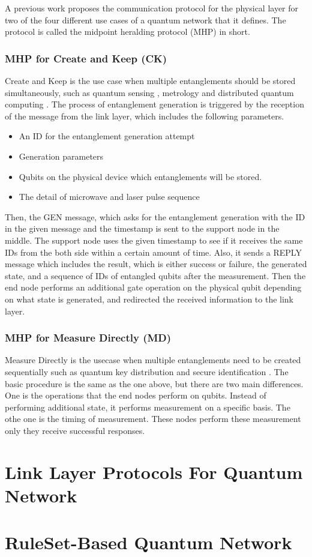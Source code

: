 A previous work \cite{Dahlberg_2019} proposes the communication protocol for the physical layer for two of the four different use cases of a quantum network that it defines.
The protocol is called the midpoint heralding protocol (MHP) in short.

\subsubsection{MHP for Create and Keep (CK)}

Create and Keep is the use case when multiple entanglements should be stored simultaneously, such as quantum sensing \cite{PhysRevLett.109.070503}, metrology \cite{komar2014quantum} and distributed quantum computing \cite{10.1145/1060590.1060662}.
The process of entanglement generation is triggered by the reception of the message from the link layer, which includes the following parameters.
\begin{itemize}
  \item An ID for the entanglement generation attempt
  \item Generation parameters
  \item Qubits on the physical device which entanglements will be stored.
  \item The detail of microwave and laser pulse sequence
\end{itemize}

Then, the GEN message, which asks for the entanglement generation with the ID in the given message and the timestamp is sent to the support node in the middle. 
The support node uses the given timestamp to see if it receives the same IDs from the both side within a certain amount of time.
Also, it sends a REPLY message which includes the result, which is either success or failure, the generated state, and a sequence of IDs of entangled qubits after the measurement.
Then the end node performs an additional gate operation on the physical qubit depending on what state is generated, and redirected the received information to the link layer.

\subsubsection{MHP for Measure Directly (MD)}

Measure Directly is the usecase when multiple entanglements need to be created sequentially such as quantum key distribution \cite{PhysRevLett.67.661} and secure identification \cite{damgaard2007secure}.
The basic procedure is the same as the one above, but there are two main differences.  One is the operations that the end nodes perform on qubits.
Instead of performing additional state, it performs measurement on a specific basis.  The othe one is the timing of measurement. These nodes perform these measurement only they receive successful responses.

\section{Link Layer Protocols For Quantum Network}

\section{RuleSet-Based Quantum Network}
